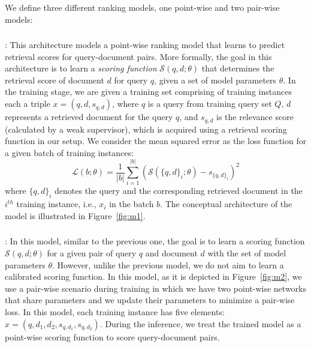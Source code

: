 We define three different ranking models, one point-wise and two pair-wise models:

\subsubsection{\label{sec:modelone}\Modelone}: This architecture models a point-wise ranking model that learns to predict retrieval scores for query-document pairs. More formally, the goal in this architecture is to learn a \emph{scoring function} $\mathcal{S}(q, d; \theta)$ that determines the retrieval score of document $d$ for query $q$, given a set of model parameters $\theta$.
%
In the training stage, we are given a training set comprising of training instances each a triple $x = (q,d, s_{q,d})$, where $q$ is a query from training query set $Q$, $d$ represents a retrieved document for the query $q$, and $s_{q,d}$ is the relevance score (calculated by a weak supervisor), which is acquired using a retrieval scoring function in our setup.
%
We consider the mean squared error as the loss function for a given batch of training instances:
\begin{equation}
\mathcal{L}(b; \theta) = \frac{1}{|b|} \sum_{i=1}^{|b|}{(\mathcal{S}(\{q, d\}_i; \theta) - s_{\{q, d\}_i})^2}
\end{equation}
where $\{q, d\}_i$ denotes the query and the corresponding retrieved document in the $i^{th}$ training instance, i.e., $x_i$ in the batch $b$.
The conceptual architecture of the model is illustrated in Figure~\ref{fig:m1}.


\subsubsection{\label{sec:modeltwo}\Modeltwo}:
In this model, similar to the previous one, the goal is to learn a scoring function $\mathcal{S}(q, d; \theta)$ for a given pair of query $q$ and document $d$ with the set of model parameters $\theta$. 
However, unlike the previous model, we do not aim to learn a calibrated scoring function. 
In this model, as it is depicted in Figure~\ref{fig:m2}, we use a pair-wise scenario during training in which we have two point-wise networks that share parameters and we update their parameters to minimize a pair-wise loss.
In this model, each training instance has five elements: $x = (q,d_1, d_2, s_{q,d_1}, s_{q,d_2})$.
During the inference, we treat the trained model as a point-wise scoring function to score query-document pairs.

